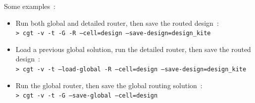 \documentclass[11pt]{article}
\begin{document}
  \noindent
  Some examples~:
  \begin{itemize}
    \item Run both global and detailed router, then save the routed design~: \\
          \texttt{> cgt -v -t -G -R --cell=design --save-design=design\_kite}
    \item Load a previous global solution, run the detailed router, then save the
          routed design~: \\
          \texttt{> cgt -v -t --load-global -R --cell=design --save-design=design\_kite}
    \item Run the global router, then save the global routing solution~: \\
          \texttt{> cgt -v -t -G --save-global --cell=design}
  \end{itemize}


 
\end{document}
